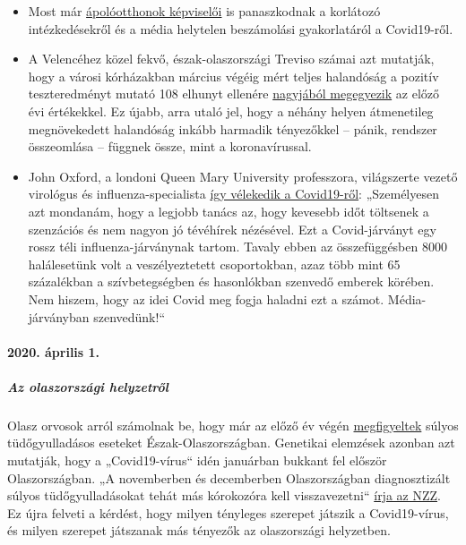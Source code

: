 \begin{itemize}
\tightlist
\item
  Most már
  \href{https://pflege-prisma.de/2020/03/31/sterbezahlen-in-pflegeheimen/}{ápolóotthonok
  képviselői} is panaszkodnak a korlátozó intézkedésekről és a média
  helytelen beszámolási gyakorlatáról a Covid19-ről.
\item
  A Velencéhez közel fekvő, észak-olaszországi Treviso számai azt
  mutatják, hogy a városi kórházakban március végéig mért teljes
  halandóság a pozitív teszteredményt mutató 108 elhunyt ellenére
  \href{https://swprs.files.wordpress.com/2020/04/reppublica-treviso.jpg}{nagyjából
  megegyezik} az előző évi értékekkel. Ez újabb, arra utaló jel, hogy a
  néhány helyen átmenetileg megnövekedett halandóság inkább harmadik
  tényezőkkel -- pánik, rendszer összeomlása -- függnek össze, mint a
  koronavírussal.
\item
  John Oxford, a londoni Queen Mary University professzora, világszerte
  vezető virológus és influenza-specialista
  \href{https://novuscomms.com/2020/03/31/a-view-from-the-hvivo-open-orphan-orph-laboratory-professor-john-oxford/}{így
  vélekedik a Covid19-ről}: „Személyesen azt mondanám, hogy a legjobb
  tanács az, hogy kevesebb időt töltsenek a szenzációs és nem nagyon jó
  tévéhírek nézésével. Ezt a Covid-járványt egy rossz téli
  influenza-járványnak tartom. Tavaly ebben az összefüggésben 8000
  halálesetünk volt a veszélyeztetett csoportokban, azaz több mint 65
  százalékban a szívbetegségben és hasonlókban szenvedő emberek körében.
  Nem hiszem, hogy az idei Covid meg fogja haladni ezt a számot.
  Média-járványban szenvedünk!``
\end{itemize}

\hypertarget{2020-uxe1prilis-1}{%
\paragraph{2020. április 1.}\label{2020-uxe1prilis-1}}

\hypertarget{az-olaszorszuxe1gi-helyzetrux151l}{%
\subparagraph{\texorpdfstring{\textbf{Az olaszországi
helyzetről}}{Az olaszországi helyzetről}}\label{az-olaszorszuxe1gi-helyzetrux151l}}

Olasz orvosok arról számolnak be, hogy már az előző év végén
\href{https://www.scmp.com/news/china/society/article/3076334/coronavirus-strange-pneumonia-seen-lombardy-november-leading}{megfigyeltek}
súlyos tüdőgyulladásos eseteket Észak-Olaszországban. Genetikai
elemzések azonban azt mutatják, hogy a „Covid19-vírus`` idén januárban
bukkant fel először Olaszországban. „A novemberben és decemberben
Olaszországban diagnosztizált súlyos tüdőgyulladásokat tehát más
kórokozóra kell visszavezetni``
\href{https://www.nzz.ch/wissenschaft/coronavirus-der-stammbaum-verraet-woher-es-kommt-ld.1548271}{írja
az NZZ}. Ez újra felveti a kérdést, hogy milyen tényleges szerepet
játszik a Covid19-vírus, és milyen szerepet játszanak más tényezők az
olaszországi helyzetben.

